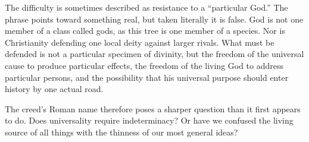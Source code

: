 The difficulty is sometimes described as resistance to a ``particular God.'' The phrase points toward something real, but taken literally it is false. God is not one member of a class called gods, as this tree is one member of a species. Nor is Christianity defending one local deity against larger rivals. What must be defended is not a particular specimen of divinity, but the freedom of the universal cause to produce particular effects, the freedom of the living God to address particular persons, and the possibility that his universal purpose should enter history by one actual road.

The creed's Roman name therefore poses a sharper question than it first appears to do. Does universality require indeterminacy? Or have we confused the living source of all things with the thinness of our most general ideas?
